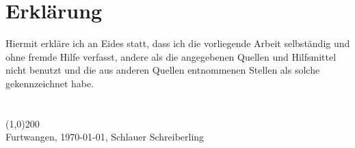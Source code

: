 \chapter*{Erklärung}

Hiermit erkl\"{a}re ich an Eides statt, dass ich die vorliegende Arbeit selbst\"{a}ndig und ohne 
fremde Hilfe verfasst, andere als die angegebenen Quellen und Hilfsmittel nicht benutzt 
und die aus anderen Quellen entnommenen Stellen als solche gekennzeichnet habe. 
\\\\\\
\line(1,0){200}\\
Furtwangen, \today, Schlauer Schreiberling